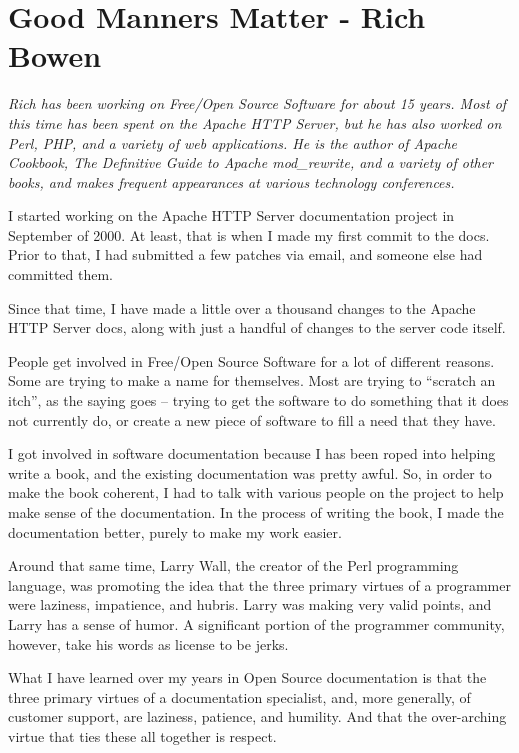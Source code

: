 \chapter{Good Manners Matter - Rich Bowen}

\textit{Rich has been working on Free/Open Source Software for about 15 years. Most of this time has been spent on the Apache HTTP Server, but he has also worked on Perl, PHP, and a variety of web applications. He is the author of Apache Cookbook, The Definitive Guide to Apache mod\_rewrite, and a variety of other books, and makes frequent appearances at various technology conferences.}

I started working on the Apache HTTP Server documentation project in September of 2000. At least, that is when I made my first commit to the docs. Prior to that, I had submitted a few patches via email, and someone else had committed them.

Since that time, I have made a little over a thousand changes to the Apache HTTP Server docs, along with just a handful of changes to the server code itself.

People get involved in Free/Open Source Software for a lot of different reasons. Some are trying to make a name for themselves. Most are trying to ``scratch an itch'', as the saying goes -- trying to get the software to do something that it does not currently do, or create a new piece of software to fill a need that they have.

I got involved in software documentation because I has been roped into helping write a book, and the existing documentation was pretty awful. So, in order to make the book coherent, I had to talk with various people on the project to help make sense of the documentation. In the process of writing the book, I made the documentation better, purely to make my work easier.

Around that same time, Larry Wall, the creator of the Perl programming language, was promoting the idea that the three primary virtues of a programmer were laziness, impatience, and hubris. Larry was making very valid points, and Larry has a sense of humor. A significant portion of the programmer community, however, take his words as license to be jerks.

What I have learned over my years in Open Source documentation is that the three primary virtues of a documentation specialist, and, more generally, of customer support, are laziness, patience, and humility. And that the over-arching virtue that ties these all together is respect.

